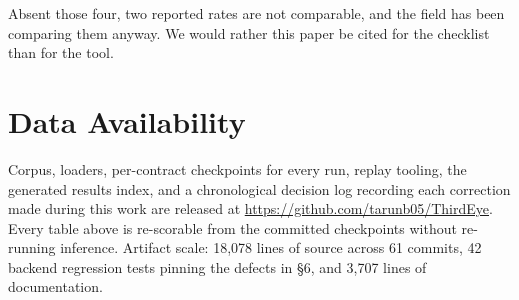 \documentclass[sigconf,nonacm]{acmart}
\begin{document}
Absent those four, two reported rates are not comparable, and the field has been
comparing them anyway. We would rather this paper be cited for the checklist than
for the tool.

\section{Data Availability}

Corpus, loaders, per-contract checkpoints for every run, replay tooling, the
generated results index, and a chronological decision log recording each
correction made during this work are released at
\url{https://github.com/tarunb05/ThirdEye}. Every table above is re-scorable from
the committed checkpoints without re-running inference. Artifact scale: 18,078
lines of source across 61 commits, 42 backend regression tests pinning the
defects in \S6, and 3,707 lines of documentation.



\end{document}
